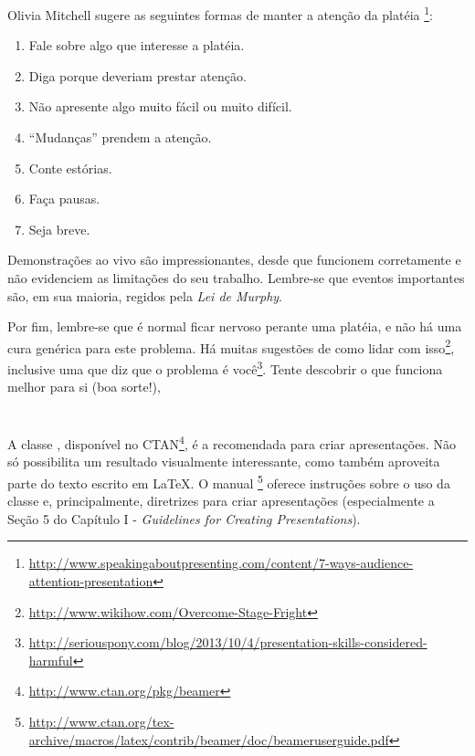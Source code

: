 Olivia Mitchell sugere as seguintes formas de manter a atenção da platéia%
\footnote{\url{http://www.speakingaboutpresenting.com/content/7-ways-audience-attention-presentation}}:
\begin{enumerate}
\item Fale sobre algo que interesse a platéia.
\item Diga porque deveriam prestar atenção.
\item Não apresente algo muito fácil ou muito difícil.
\item ``Mudanças'' prendem a atenção.
\item Conte estórias.
\item Faça pausas.
\item Seja breve.
\end{enumerate}

Demonstrações ao vivo são impressionantes, desde que funcionem corretamente e não
evidenciem as limitações do seu trabalho. Lembre-se que eventos importantes são, 
em sua maioria, regidos pela \emph{Lei de Murphy}.%

Por fim, lembre-se que é normal ficar nervoso perante uma platéia, e não há uma 
cura genérica para este problema. Há muitas sugestões de como lidar com isso\footnote{\url{http://www.wikihow.com/Overcome-Stage-Fright}}, 
inclusive uma que diz que o problema é você\footnote{\url{http://seriouspony.com/blog/2013/10/4/presentation-skills-considered-harmful}}.
Tente descobrir o que funciona melhor para si (boa sorte!),


\newcommand{\beamer}{{}}%
\section{\beamer}
A classe \beamer, disponível no CTAN\footnote{\url{http://www.ctan.org/pkg/beamer}},
é a recomendada para criar apresentações. Não só possibilita um resultado visualmente
interessante, como também aproveita parte do texto escrito em \LaTeX. O manual%
\footnote{\url{http://www.ctan.org/tex-archive/macros/latex/contrib/beamer/doc/beameruserguide.pdf}} 
oferece instruções sobre o uso da classe e, principalmente, diretrizes para criar
apresentações (especialmente a Seção 5 do Capítulo I - \emph{Guidelines for 
Creating Presentations}).